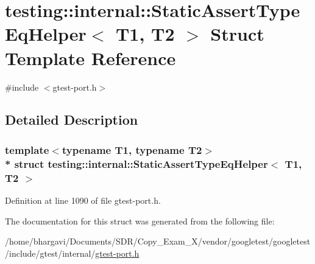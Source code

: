 \hypertarget{structtesting_1_1internal_1_1_static_assert_type_eq_helper}{}\section{testing\+:\+:internal\+:\+:Static\+Assert\+Type\+Eq\+Helper$<$ T1, T2 $>$ Struct Template Reference}
\label{structtesting_1_1internal_1_1_static_assert_type_eq_helper}


{\ttfamily \#include $<$gtest-\/port.\+h$>$}



\subsection{Detailed Description}
\subsubsection*{template$<$typename T1, typename T2$>$\\*
struct testing\+::internal\+::\+Static\+Assert\+Type\+Eq\+Helper$<$ T1, T2 $>$}



Definition at line 1090 of file gtest-\/port.\+h.



The documentation for this struct was generated from the following file\+:\begin{DoxyCompactItemize}
\item 
/home/bhargavi/\+Documents/\+S\+D\+R/\+Copy\+\_\+\+Exam\+\_\+X/vendor/googletest/googletest/include/gtest/internal/\hyperlink{gtest-port_8h}{gtest-\/port.\+h}\end{DoxyCompactItemize}
